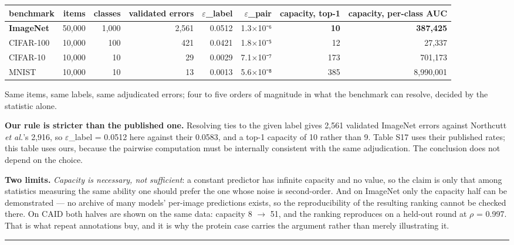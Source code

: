 \begin{center}\footnotesize
\begin{tabular}{lrrrrrrr}
\toprule
\textbf{benchmark} & \textbf{items} & \textbf{classes} & \textbf{validated errors} & \textbf{$\varepsilon$\_label} & \textbf{$\varepsilon$\_pair} & \textbf{capacity, top-1} & \textbf{capacity, per-class AUC} \\
\midrule
\textbf{ImageNet} & 50,000 & 1,000 & 2,561 & 0.0512 & 1.3$\times$10⁻⁶ & \textbf{10} & \textbf{387,425} \\
CIFAR-100 & 10,000 & 100 & 421 & 0.0421 & 1.8$\times$10⁻⁵ & 12 & 27,337 \\
CIFAR-10 & 10,000 & 10 & 29 & 0.0029 & 7.1$\times$10⁻⁷ & 173 & 701,173 \\
MNIST & 10,000 & 10 & 13 & 0.0013 & 5.6$\times$10⁻⁸ & 385 & 8,990,001 \\
\bottomrule
\end{tabular}
\end{center}

Same items, same labels, same adjudicated errors; four to five orders of
magnitude in what the benchmark can resolve, decided by the statistic alone.

\textbf{Our rule is stricter than the published one.} Resolving ties to the given
label gives 2,561 validated ImageNet errors against Northcutt \emph{et al.}'s 2,916,
so $\varepsilon$\_label = 0.0512 here against their 0.0583, and a top-1 capacity of 10 rather
than 9. Table S17 uses their published rates; this table uses ours, because the
pairwise computation must be internally consistent with the same adjudication.
The conclusion does not depend on the choice.

\textbf{Two limits.} \emph{Capacity is necessary, not sufficient}: a constant predictor
has infinite capacity and no value, so the claim is only that among statistics
measuring the same ability one should prefer the one whose noise is
second-order. And on ImageNet only the capacity half can be demonstrated --- no
archive of many models' per-image predictions exists, so the reproducibility of
the resulting ranking cannot be checked there. On CAID both halves are shown on
the same data: capacity 8 $\rightarrow$ 51, and the ranking reproduces on a held-out round
at $\rho$ = 0.997. That is what repeat annotations buy, and it is why the protein
case carries the argument rather than merely illustrating it.


\vspace{0.5em}\hrule\vspace{0.8em}


